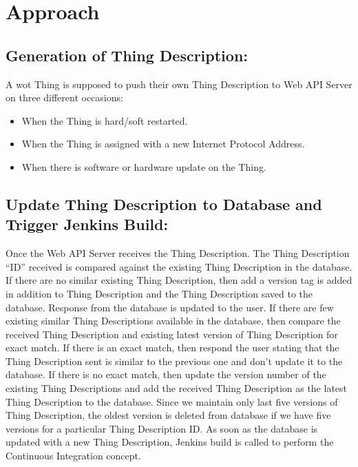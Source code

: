 \documentclass[conference]{IEEEtran}
\theoremstyle{definition}
\begin{document}
\section{Approach}

\subsection{Generation of Thing Description:}
  
A \ac{wot} Thing is supposed to push their own Thing Description to Web API Server on three different occasions:

\begin{itemize}
\item When the Thing is hard/soft restarted.
\item When the Thing is assigned with a new Internet Protocol Address.
\item When there is software or hardware update on the Thing.
\end{itemize}

\subsection{Update Thing Description to Database and Trigger Jenkins Build:}
  
Once the Web API Server receives the Thing Description. 
The Thing Description “ID” received is compared against the existing Thing Description in the database. 
If there are no similar existing Thing Description, then add a version tag is added in addition to Thing Description and the Thing Description saved to the database. 
Response from the database is updated to the user. 
If there are few existing similar Thing Descriptions available in the database, then compare the received Thing Description and existing latest version of Thing Description for exact match. 
If there is an exact match, then respond the user stating that the Thing Description sent is similar to the previous one and don’t update it to the database. 
If there is no exact match, then update the version number of the existing Thing Descriptions and add the received Thing Description as the latest Thing Description to the database. 
Since we maintain only last five versions of Thing Description, the oldest version is deleted from database if we have five versions for a particular Thing Description ID. 
As soon as the database is updated with a new Thing Description, Jenkins build is called to perform the Continuous Integration concept.
\end{document}
